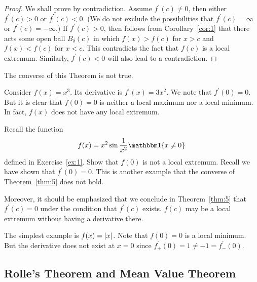 \documentclass[thmcnt=section, 12pt]{my-elegantbook}
\begin{document}
\begin{proof}
    We shall prove by contradiction. Assume $f^\prime(c) \neq 0$, then either $f^\prime(c) > 0$ or $f^\prime(c) < 0$. (We do not exclude the possibilities that $f^\prime(c) = \infty$ or $f^\prime(c) = -\infty$.) If $f^\prime(c) > 0$, then follows from Corollary~\ref{cor:1} that there acts some open ball $B_\delta(c)$ in which $f(x) > f(c)$ for $x > c$ and $f(x) < f(c)$ for $x < c$. This contradicts the fact that $f(c)$ is a local extremum. Similarly, $f^\prime(c) < 0$ will also lead to a contradiction.
\end{proof}

\par The converse of this Theorem is not true.

\begin{example}
    Consider $f(x) = x^3$. Its derivative is $f^\prime(x) = 3x^2$. We note that $f^\prime(0) = 0$. But it is clear that $f(0) = 0$ is neither a local maximum nor a local minimum. In fact, $f(x)$ does not have any local extremum.
\end{example}

\begin{exercise}
    Recall the function
    \begin{align*}
        f(x) = x^2 \sin \frac{1}{x^2} \ind\{x \neq 0\}
    \end{align*}
    defined in Exercise~\ref{ex:1}. Show that $f(0)$ is not a local extremum. Recall we have shown that $f^\prime(0) = 0$. This is another example that the converse of Theorem~\ref{thm:5} does not hold.
\end{exercise}

\par Moreover, it should be emphasized that we conclude in Theorem~\ref{thm:5} that $f^\prime(c) = 0$ under the condition that $f^\prime(c)$ exists. $f(c)$ may be a local extremum without having a derivative there.

\begin{example}
    The simplest example is $f(x) = \left\lvert x \right\rvert$. Note that $f(0) = 0$ is a local minimum. But the derivative does not exist at $x = 0$ since $f^\prime_{+}(0) = 1 \neq -1 = f^\prime_{-}(0)$.
\end{example}


\subsection{Rolle's Theorem and Mean Value Theorem}
\end{document}
